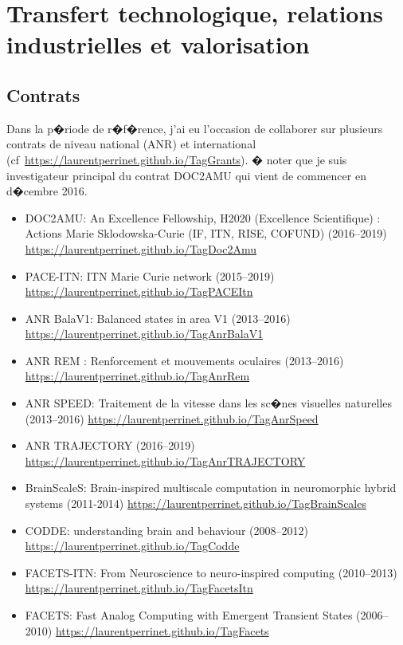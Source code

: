 \chapter{Transfert technologique, relations industrielles et valorisation} %


\section{Contrats} %
Dans la p�riode de r�f�rence, j'ai eu l'occasion de collaborer sur plusieurs contrats de niveau national (ANR) et international (cf~\url{https://laurentperrinet.github.io/TagGrants}). � noter que je suis investigateur principal du contrat DOC2AMU qui vient de commencer en d�cembre 2016.

\begin{itemize}
	\item  	DOC2AMU: An Excellence Fellowship, H2020 (Excellence Scientifique) : Actions Marie Sklodowska-Curie (IF, ITN, RISE, COFUND) (2016--2019) \url{https://laurentperrinet.github.io/TagDoc2Amu}
	\item  	PACE-ITN: ITN Marie Curie network (2015--2019) \url{https://laurentperrinet.github.io/TagPACEItn}
	\item   ANR BalaV1: Balanced states in area V1 (2013--2016) \url{https://laurentperrinet.github.io/TagAnrBalaV1}
	\item  	ANR REM : Renforcement et mouvements oculaires (2013--2016) \url{https://laurentperrinet.github.io/TagAnrRem}
	\item  	ANR SPEED: Traitement de la vitesse dans les sc�nes visuelles naturelles (2013--2016) \url{https://laurentperrinet.github.io/TagAnrSpeed}
	\item  	ANR TRAJECTORY (2016--2019) \url{https://laurentperrinet.github.io/TagAnrTRAJECTORY}
	\item  	BrainScaleS: Brain-inspired multiscale computation in neuromorphic hybrid systems (2011-2014) \url{https://laurentperrinet.github.io/TagBrainScales}
	\item  	CODDE: understanding brain and behaviour (2008--2012) \url{https://laurentperrinet.github.io/TagCodde}
	\item  	FACETS-ITN: From Neuroscience to neuro-inspired computing (2010--2013) \url{https://laurentperrinet.github.io/TagFacetsItn}
	\item  	FACETS: Fast Analog Computing with Emergent Transient States (2006--2010) \url{https://laurentperrinet.github.io/TagFacets}
\end{itemize}


